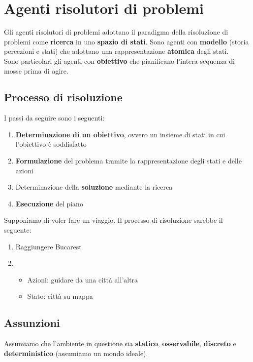 \newpage
\section{Agenti risolutori di problemi}
Gli agenti risolutori di problemi adottano il paradigma della risoluzione di problemi come \textbf{ricerca} in uno \textbf{spazio di stati}. Sono agenti con \textbf{modello} (storia percezioni e stati) che adottano una rappresentazione \textbf{atomica} degli stati.\\
Sono particolari gli agenti con \textbf{obiettivo} che pianificano l'intera sequenza di mosse prima di agire.

\subsection{Processo di risoluzione}
I passi da seguire sono i seguenti:
\begin{enumerate}
	\item \textbf{Determinazione di un obiettivo}, ovvero un insieme di stati in cui l'obiettivo è soddisfatto
	\item \textbf{Formulazione} del problema tramite la rappresentazione degli stati e delle azioni
	\item Determinazione della \textbf{soluzione} mediante la ricerca
	\item \textbf{Esecuzione} del piano
\end{enumerate}

\begin{example}
	Supponiamo di voler fare un viaggio. Il processo di risoluzione sarebbe il seguente:
	\begin{enumerate}
		\item Raggiungere Bucarest
		\item \begin{itemize}
			\item Azioni: guidare da una città all'altra
			\item Stato: città su mappa
		\end{itemize}
	\end{enumerate}
\end{example}

\subsection{Assunzioni}
Assumiamo che l'ambiente in questione sia \textbf{statico}, \textbf{osservabile}, \textbf{discreto} e \textbf{deterministico} (assumiamo un mondo ideale).

